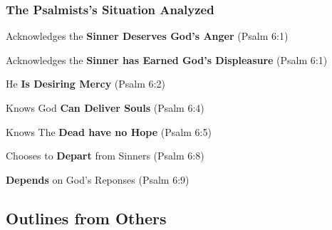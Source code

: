 \subsubsection{The Psalmists's Situation Analyzed}
\begin{compactenum}[I.]
    \item Acknowledges the \textbf{Sinner Deserves God's Anger}   (Psalm 6:1)
    \item Acknowledges the \textbf{Sinner has Earned God's Displeasure}   (Psalm 6:1)
    \item He \textbf{Is Desiring Mercy}   (Psalm 6:2)
    \item Knows God \textbf{Can Deliver Souls}   (Psalm 6:4)
    \item Knows The \textbf{Dead have no Hope}   (Psalm 6:5)
    \item Chooses to \textbf{Depart} from Sinners  (Psalm 6:8)
    \item \textbf{Depends} on God's Reponses  (Psalm 6:9)
\end{compactenum}

\subsection{Outlines from Others}

